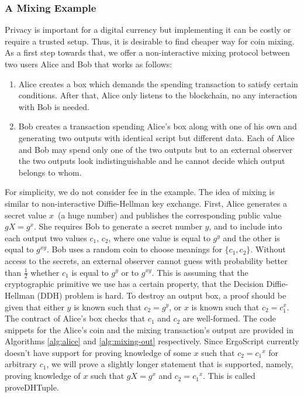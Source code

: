 \subsubsection{A Mixing Example}
 \label{sec:platform}

 Privacy is important for a digital currency but implementing it can be costly or require a trusted setup. Thus, it is desirable to find cheaper way for coin mixing. As a first step towards that, we offer a non-interactive mixing protocol between two users Alice and Bob that works as follows:
 \begin{enumerate}
    \item{} Alice creates a box which demands the spending transaction to satisfy certain conditions. After that, Alice only listens to the blockchain, no any interaction with Bob is needed.
    \item{} Bob creates a transaction spending Alice's box along with one of his own and generating two outputs with identical script but different data. Each of Alice and Bob may spend only one of the two outputs but to an external observer the two outputs look indistinguishable and he cannot decide which output belongs to whom.
 \end{enumerate}

 For simplicity, we do not consider fee in the example. The idea of mixing is similar to non-interactive Diffie-Hellman key exchange. First, Alice generates a secret value $x$~(a huge number) and publishes the corresponding public value $gX = g^x$. She requires Bob to generate a secret number $y$, and to include into each output two
 values $c_1$, $c_2$, where one value is equal to $g^y$ and the other is equal to $g^{xy}$. Bob uses a random coin to choose meanings for $\{c_1, c_2\}$. Without access to the secrets, an external observer cannot guess with probability better than  $\frac{1}{2}$ whether $c_1$ is equal to $g^y$ or to $g^{xy}$. This is assuming that the cryptographic primitive we use has a certain property, that the Decision Diffie-Hellman (DDH) problem is hard. To destroy an output box, a proof should be given that either $y$ is known such that $c_2 = g^y$, or $x$ is known such that $c_2 = c_1^x$.
 The contract of Alice's box checks that $c_1$ and $c_2$ are well-formed. The code snippets for the Alice's coin and the mixing transaction's output are provided in Algorithms \ref{alg:alice} and \ref{alg:mixing-out} respectively. Since ErgoScript currently doesn't have support for proving knowledge of some $x$ such that $c_2 = {c_1}^x$ for arbitrary $c_1$,  we will prove a slightly longer statement that is supported, namely, proving knowledge of $x$ such that $gX = g^x$ and $c_2 = {c_1}^x$. This is called proveDHTuple.

